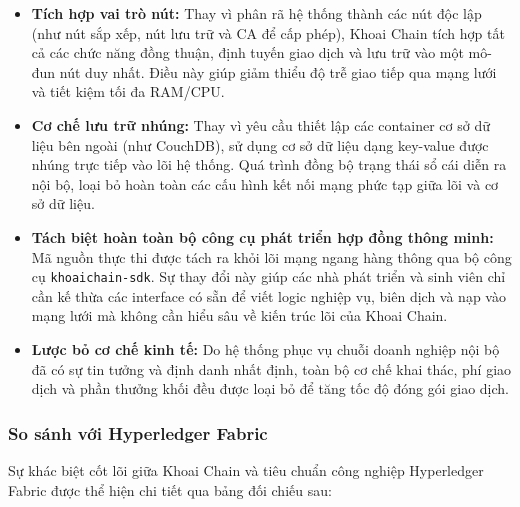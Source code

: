 \documentclass[12pt,a4paper]{article}
\begin{document}
\begin{itemize}
    \item \textbf{Tích hợp vai trò nút:} Thay vì phân rã hệ thống thành các nút độc lập (như nút sắp xếp, nút lưu trữ và CA để cấp phép), Khoai Chain tích hợp tất cả các chức năng đồng thuận, định tuyến giao dịch và lưu trữ vào một mô-đun nút duy nhất. Điều này giúp giảm thiểu độ trễ giao tiếp qua mạng lưới và tiết kiệm tối đa RAM/CPU.
    \item \textbf{Cơ chế lưu trữ nhúng:} Thay vì yêu cầu thiết lập các container cơ sở dữ liệu bên ngoài (như CouchDB), sử dụng cơ sở dữ liệu dạng key-value được nhúng trực tiếp vào lõi hệ thống. Quá trình đồng bộ trạng thái sổ cái diễn ra nội bộ, loại bỏ hoàn toàn các cấu hình kết nối mạng phức tạp giữa lõi và cơ sở dữ liệu.
    \item \textbf{Tách biệt hoàn toàn bộ công cụ phát triển hợp đồng thông minh:} Mã nguồn thực thi được tách ra khỏi lõi mạng ngang hàng thông qua bộ công cụ \texttt{khoaichain-sdk}. Sự thay đổi này giúp các nhà phát triển và sinh viên chỉ cần kế thừa các interface có sẵn để viết logic nghiệp vụ, biên dịch và nạp vào mạng lưới mà không cần hiểu sâu về kiến trúc lõi của Khoai Chain.
    \item \textbf{Lược bỏ cơ chế kinh tế:} Do hệ thống phục vụ chuỗi doanh nghiệp nội bộ đã có sự tin tưởng và định danh nhất định, toàn bộ cơ chế khai thác, phí giao dịch và phần thưởng khối đều được loại bỏ để tăng tốc độ đóng gói giao dịch.
\end{itemize}
\newpage
\subsubsection{So sánh với Hyperledger Fabric}
Sự khác biệt cốt lõi giữa Khoai Chain và tiêu chuẩn công nghiệp Hyperledger Fabric được thể hiện chi tiết qua bảng đối chiếu sau:
\end{document}
